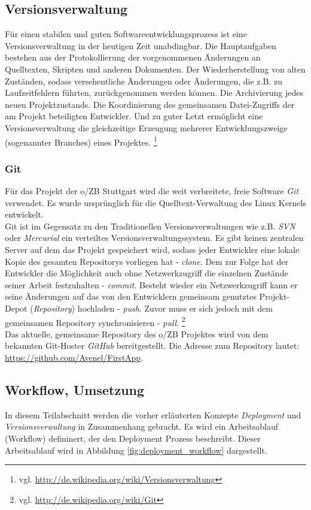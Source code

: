 \documentclass[12pt,             %
               a4paper,          %
               listof=totoc,     %
               index=totoc,      %
               bibliography=totoc,%
               oneside,         %
               BCOR1cm,          %
               english   %
               ]{scrbook}
\begin{document}
\subsection{Versionsverwaltung}
Für einen stabilen und guten Softwareentwicklungsprozess ist eine Versionsverwaltung in der heutigen Zeit unabdingbar. Die Hauptaufgaben bestehen aus der Protokollierung der vorgenommenen Änderungen an Quelltexten, Skripten und anderen Dokumenten. Der Wiederherstellung von alten Zuständen, sodass versehentliche Änderungen oder Änderungen, die z.B. zu Laufzeitfehlern führten, zurückgenommen werden können. Die Archivierung jedes neuen Projektzustands. Die Koordinierung des gemeinsamen Datei-Zugriffs der am Projekt beteiligten Entwickler. Und zu guter Letzt ermöglicht eine Versionsverwaltung die gleichzeitige Erzeugung mehrerer Entwicklungszweige (sogenannter \glqq Branches\grqq) eines Projektes. \footnote{vgl. \url{http://de.wikipedia.org/wiki/Versionsverwaltung}}

\subsubsection{Git}
Für das Projekt der o/ZB Stuttgart wird die weit verbreitete, freie Software \textit{Git} verwendet. Es wurde ursprünglich für die Quelltext-Verwaltung des Linux Kernels entwickelt.\\
Git ist im Gegensatz zu den Traditionellen Versionsverwaltungen wie z.B. \textit{SVN} oder \textit{Mercurial} ein verteiltes Versionsverwaltungssystem. Es gibt keinen zentralen Server auf dem das Projekt gespeichert wird, sodass jeder Entwickler eine lokale Kopie des gesamten Repositorys vorliegen hat - \textit{clone}. Dem zur Folge hat der Entwickler die Möglichkeit auch ohne Netzwerkzugriff die einzelnen Zustände seiner Arbeit festzuhalten - \textit{commit}. Besteht wieder ein Netzwerkzugriff kann er seine Änderungen auf das von den Entwicklern gemeinsam genutztes Projekt-Depot (\textit{Repository}) hochladen - \textit{push}. Zuvor muss er sich jedoch mit dem gemeinsamen Repository synchronisieren - \textit{pull}. \footnote{vgl. \url{http://de.wikipedia.org/wiki/Git}}\\

Das aktuelle, gemeinsame Repository des o/ZB Projektes wird von dem bekannten Git-Hoster \textit{GitHub} bereitgestellt. Die Adresse zum Repository lautet: \url{https://github.com/Avenel/FirstApp}.

\subsection{Workflow, Umsetzung}
In diesem Teilabschnitt werden die vorher erläuterten Konzepte \textit{Deployment} und \textit{Versionsverwaltung} in Zusammenhang gebracht. Es wird ein Arbeitsablauf (\glqq Workflow\grqq) defininert, der den Deployment Prozess beschreibt. Dieser Arbeitsablauf wird in Abbildung \vref{fig:deployment_workflow} dargestellt.
\end{document}

